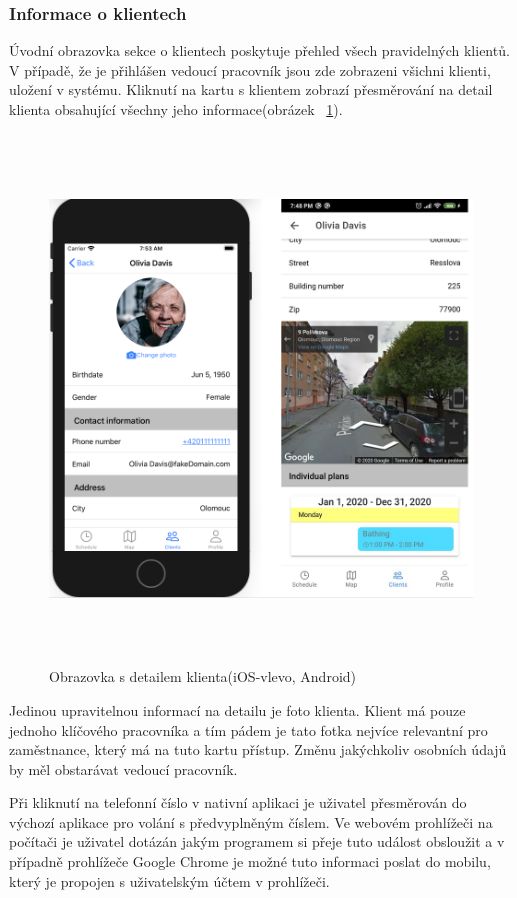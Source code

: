 \documentclass[
  biblatex,
  glossaries,
  index
]{kidiplom}
\begin{document}
\subsubsection{Informace o klientech}
Úvodní obrazovka sekce o klientech poskytuje přehled všech pravidelných klientů. V případě, že je přihlášen vedoucí pracovník jsou zde zobrazeni všichni klienti, uložení v systému. Kliknutí na kartu s klientem zobrazí přesměrování na detail klienta obsahující všechny jeho informace(obrázek ~\ref{fig:clientDetail}).

\begin{figure}[H]
  	\centering
 	 \includegraphics[width=14cm,height=14cm,keepaspectratio]{client_detail}
 	 \caption{Obrazovka s detailem klienta(iOS-vlevo, Android)}
 	 \label{fig:clientDetail}
\end{figure}

Jedinou upravitelnou informací na detailu je foto klienta. Klient má pouze jednoho klíčového pracovníka a tím pádem je tato fotka nejvíce relevantní pro zaměstnance, který má na tuto kartu přístup. Změnu jakýchkoliv osobních údajů by měl obstarávat vedoucí pracovník. 

Při kliknutí na telefonní číslo v nativní aplikaci je uživatel přesměrován do výchozí aplikace pro volání s předvyplněným číslem. Ve webovém prohlížeči na počítači je uživatel dotázán jakým programem si přeje tuto událost obsloužit a v případně prohlížeče Google Chrome je možné tuto informaci poslat do mobilu, který je propojen s uživatelským účtem v prohlížeči.
\end{document}
